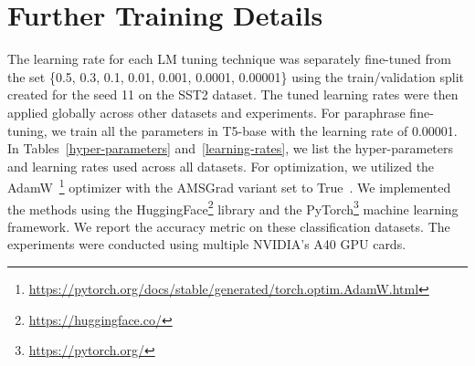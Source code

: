 \documentclass[11pt]{article}
\begin{document}

\section{Further Training Details}
\label{training-details-extra:appendix}

The learning rate for each LM tuning technique was separately fine-tuned from the set \{0.5, 0.3, 0.1, 0.01, 0.001, 0.0001, 0.00001\} using the train/validation split created for the seed 11 on the SST2 dataset. The tuned learning rates were then applied globally across other datasets and experiments. For paraphrase fine-tuning, we train all the parameters in T5-base with the learning rate of 0.00001. In Tables~\ref{hyper-parameters} and~\ref{learning-rates}, we list the hyper-parameters and learning rates used across all datasets.  For optimization, we utilized the AdamW~\cite{DBLP:journals/corr/abs-1711-05101}\footnote{\url{https://pytorch.org/docs/stable/generated/torch.optim.AdamW.html}} optimizer with the AMSGrad variant set to True~\cite{DBLP:journals/corr/abs-1904-09237}. We implemented the methods using the HuggingFace\footnote{\url{https://huggingface.co/}} library and the PyTorch\footnote{\url{https://pytorch.org/}} machine learning framework. We report the accuracy metric on these classification datasets. The experiments were conducted using multiple NVIDIA's A40 GPU cards. 
\end{document}
